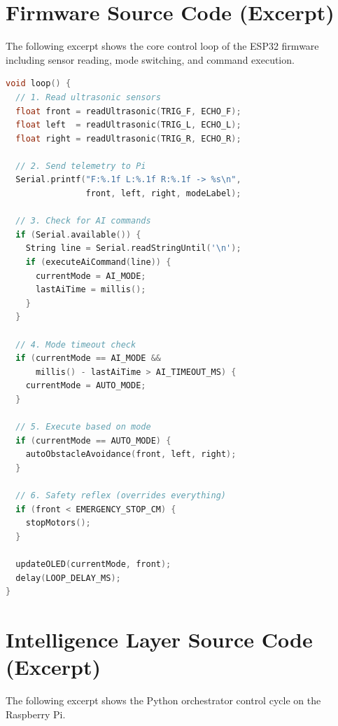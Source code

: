 \section{Firmware Source Code (Excerpt)}
\label{sec:fw_code}

The following excerpt shows the core control loop of the ESP32 firmware including sensor reading, mode switching, and command execution.

\begin{lstlisting}[language=C++, caption={ESP32 firmware main loop (simplified)}, label={lst:fw_main}]
void loop() {
  // 1. Read ultrasonic sensors
  float front = readUltrasonic(TRIG_F, ECHO_F);
  float left  = readUltrasonic(TRIG_L, ECHO_L);
  float right = readUltrasonic(TRIG_R, ECHO_R);

  // 2. Send telemetry to Pi
  Serial.printf("F:%.1f L:%.1f R:%.1f -> %s\n",
                front, left, right, modeLabel);

  // 3. Check for AI commands
  if (Serial.available()) {
    String line = Serial.readStringUntil('\n');
    if (executeAiCommand(line)) {
      currentMode = AI_MODE;
      lastAiTime = millis();
    }
  }

  // 4. Mode timeout check
  if (currentMode == AI_MODE &&
      millis() - lastAiTime > AI_TIMEOUT_MS) {
    currentMode = AUTO_MODE;
  }

  // 5. Execute based on mode
  if (currentMode == AUTO_MODE) {
    autoObstacleAvoidance(front, left, right);
  }

  // 6. Safety reflex (overrides everything)
  if (front < EMERGENCY_STOP_CM) {
    stopMotors();
  }

  updateOLED(currentMode, front);
  delay(LOOP_DELAY_MS);
}
\end{lstlisting}

\section{Intelligence Layer Source Code (Excerpt)}
\label{sec:ai_code}

The following excerpt shows the Python orchestrator control cycle on the Raspberry Pi.

